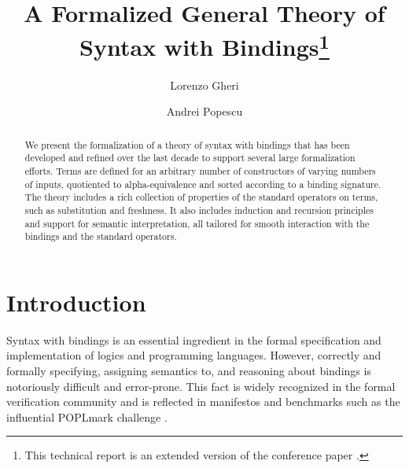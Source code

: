 \documentclass{llncs}
\begin{document}
\title{A Formalized General Theory of Syntax with Bindings\thanks{This technical report is an extended version of the conference paper \cite{our-own-paper}. }
}
%
\author{Lorenzo Gheri \and Andrei Popescu}




\maketitle


\begin{abstract}
\vspace*{-5ex}
We present the formalization of a theory of syntax with bindings that has 
been developed and refined over the last decade to support several large formalization 
efforts. Terms are defined for an arbitrary number of constructors of varying 
numbers of inputs, quotiented to alpha-equivalence and sorted 
according to a binding signature. 
The theory includes a rich collection of properties of the standard operators  
on terms, such as substitution and freshness. %
It also includes induction and recursion principles and support for semantic interpretation, 
all tailored for smooth interaction with the bindings and the standard operators.  %
\end{abstract}






\vspace*{-5ex}
\section{Introduction}

Syntax with bindings is an essential ingredient in the formal specification and 
implementation of logics and programming languages. However, correctly and formally specifying, 
assigning semantics to,
and reasoning about bindings is notoriously difficult and error-prone. This fact is 
widely recognized in the formal verification community 
and is reflected in %
manifestos and benchmarks 
such as the influential POPLmark challenge \cite{POPLmark}. 
 
\end{document}
